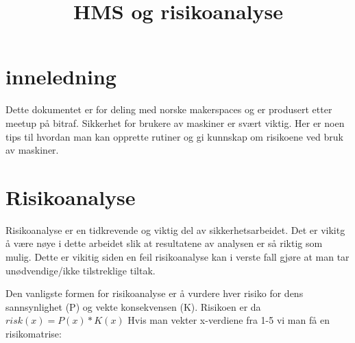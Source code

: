 \documentclass{artikel1}
\title{HMS og risikoanalyse}
\begin{document}
\maketitle
\section*{inneledning}
Dette dokumentet er for deling med norske makerspaces og er produsert etter meetup på bitraf.
Sikkerhet for brukere av maskiner er svært viktig. Her er noen tips til hvordan man kan opprette rutiner og gi kunnskap om risikoene ved bruk av maskiner.


\section*{Risikoanalyse}
Risikoanalyse er en tidkrevende og viktig del av sikkerhetsarbeidet. Det er vikitg å være nøye i dette arbeidet slik at resultatene av analysen er så riktig som mulig.
Dette er vikitig siden en feil risikoanalyse kan i verste fall gjøre at man tar unødvendige/ikke tilstreklige tiltak.

Den vanligste formen for risikoanalyse er å vurdere hver risiko for dens sannsynlighet (P) og vekte konsekvensen (K). Risikoen er da $risk(x)=P(x) * K(x)$
Hvis man vekter x-verdiene fra 1-5 vi man få en risikomatrise:
\end{document}
